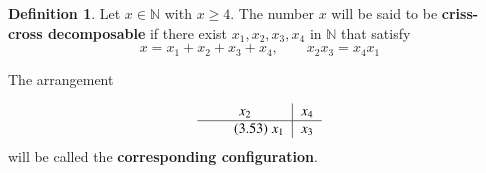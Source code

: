 \documentclass[a4paper,12pt]{article}
\theoremstyle{definition}
\theoremstyle{underlinethm}
\newtheorem{definition}{Definition}[section]
\theoremstyle{definition}
\begin{document}
\begin{definition}\label{definition-3.5}
Let $x\in \mathbb{N}$ with $x \geq 4$. The number $x$ will be said to be \textbf{criss-cross decomposable} if there exist $x_{1}, x_{2}, x_{3}, x_{4}$ in $\mathbb{N}$ that satisfy
\begin{equation}
x= x_{1} + x_{2} + x_{3} + x_{4}, \qquad x_{2} x_{3} = x_{4} x_{1}\tag{3.52}\label{eq-3.52}
\end{equation}

The arrangement 

\begin{equation}
\begin{tabular}{c|c}
$x_{2}$ & $x_{4}$\\\hline\tag{3.53}\label{eq-3.53}
$x_{1}$ & $x_{3}$
\end{tabular}
\end{equation}
will be called the \textbf{corresponding configuration}.
\end{definition}
\end{document}
